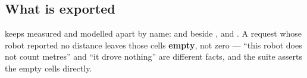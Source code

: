 \subsection{What is exported}

 keeps measured and modelled apart by name:
 and  beside ,
 and . A request whose robot
reported no distance leaves those cells \textbf{empty}, not zero --- ``this
robot does not count metres'' and ``it drove nothing'' are different
facts, and the suite asserts the empty cells directly.
